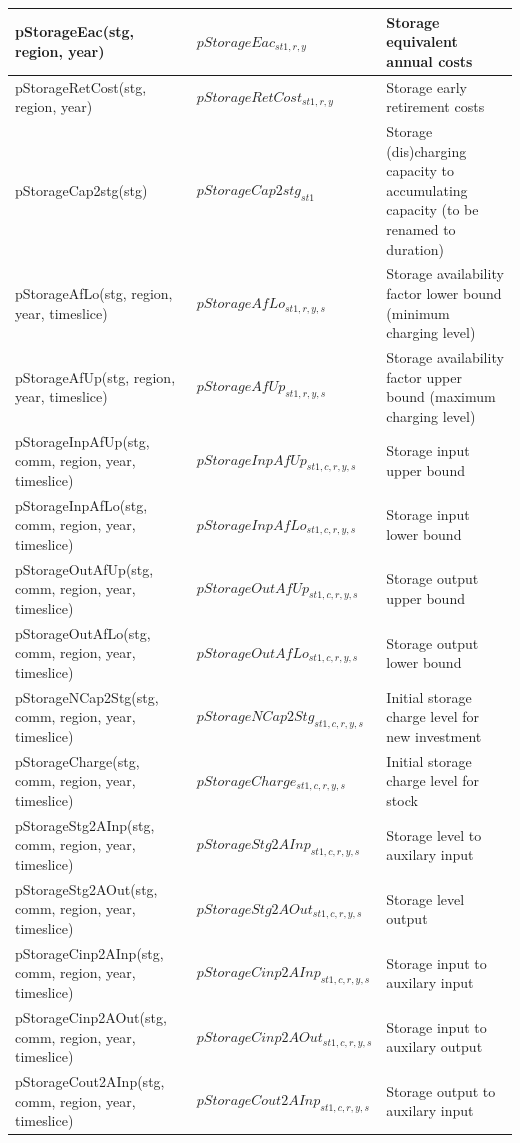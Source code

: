 \documentclass{article}
\begin{document}
\begin{longtable}{|p{10cm}|p{5cm}|p{9cm}|}
 \hline
pStorageEac(stg, region, year) & $pStorageEac_{st1,r,y}$ & Storage equivalent annual costs \\
 \hline
pStorageRetCost(stg, region, year) & $pStorageRetCost_{st1,r,y}$ & Storage early retirement costs \\
 \hline
pStorageCap2stg(stg) & $pStorageCap2stg_{st1}$ & Storage (dis)charging capacity to accumulating capacity (to be renamed to duration) \\
 \hline
pStorageAfLo(stg, region, year, timeslice) & $pStorageAfLo_{st1,r,y,s}$ & Storage availability factor lower bound (minimum charging level) \\
 \hline
pStorageAfUp(stg, region, year, timeslice) & $pStorageAfUp_{st1,r,y,s}$ & Storage availability factor upper bound (maximum charging level) \\
 \hline
pStorageInpAfUp(stg, comm, region, year, timeslice) & $pStorageInpAfUp_{st1,c,r,y,s}$ & Storage input upper bound \\
 \hline
pStorageInpAfLo(stg, comm, region, year, timeslice) & $pStorageInpAfLo_{st1,c,r,y,s}$ & Storage input lower bound \\
 \hline
pStorageOutAfUp(stg, comm, region, year, timeslice) & $pStorageOutAfUp_{st1,c,r,y,s}$ & Storage output upper bound \\
 \hline
pStorageOutAfLo(stg, comm, region, year, timeslice) & $pStorageOutAfLo_{st1,c,r,y,s}$ & Storage output lower bound \\
 \hline
pStorageNCap2Stg(stg, comm, region, year, timeslice) & $pStorageNCap2Stg_{st1,c,r,y,s}$ & Initial storage charge level for new investment \\
 \hline
pStorageCharge(stg, comm, region, year, timeslice) & $pStorageCharge_{st1,c,r,y,s}$ & Initial storage charge level for stock \\
 \hline
pStorageStg2AInp(stg, comm, region, year, timeslice) & $pStorageStg2AInp_{st1,c,r,y,s}$ & Storage level to auxilary input \\
 \hline
pStorageStg2AOut(stg, comm, region, year, timeslice) & $pStorageStg2AOut_{st1,c,r,y,s}$ & Storage level output \\
 \hline
pStorageCinp2AInp(stg, comm, region, year, timeslice) & $pStorageCinp2AInp_{st1,c,r,y,s}$ & Storage input to auxilary input \\
 \hline
pStorageCinp2AOut(stg, comm, region, year, timeslice) & $pStorageCinp2AOut_{st1,c,r,y,s}$ & Storage input to auxilary output \\
 \hline
pStorageCout2AInp(stg, comm, region, year, timeslice) & $pStorageCout2AInp_{st1,c,r,y,s}$ & Storage output to auxilary input \\

\end{longtable}
\end{document}

